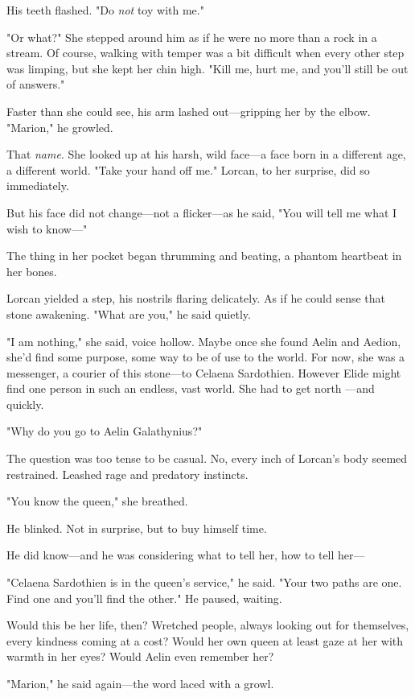 His teeth flashed.
"Do \emph{not} toy with me."

"Or what?"
She stepped around him as if he were no more than a rock in a stream.
Of course, walking with temper was a bit difficult when every other step was limping, but she kept her chin high.
"Kill me, hurt me, and you'll still be out of answers."

Faster than she could see, his arm lashed out---gripping her by the elbow.
"Marion," he growled.

That \emph{name}.
She looked up at his harsh, wild face---a face born in a different age, a different world.
"Take your hand off me."
Lorcan, to her surprise, did so immediately.

But his face did not change---not a flicker---as he said, "You will tell me what I wish to know---"

The thing in her pocket began thrumming and beating, a phantom heartbeat in her bones.

Lorcan yielded a step, his nostrils flaring delicately.
As if he could sense that stone awakening.
"What are you," he said quietly.

"I am nothing," she said, voice hollow.
Maybe once she found Aelin and Aedion, she'd find some purpose, some way to be of use to the world.
For now, she was a messenger, a courier of this stone---to Celaena Sardothien.
However Elide might find one person in such an endless, vast world.
She had to get north ---and quickly.

"Why do you go to Aelin Galathynius?"

The question was too tense to be casual.
No, every inch of Lorcan's body seemed restrained.
Leashed rage and predatory instincts.

"You know the queen," she breathed.

He blinked.
Not in surprise, but to buy himself time.

He did know---and he was considering what to tell her, how to tell her---

"Celaena Sardothien is in the queen's service," he said.
"Your two paths are one.
Find one and you'll find the other."
He paused, waiting.

Would this be her life, then?
Wretched people, always looking out for themselves, every kindness coming at a cost?
Would her own queen at least gaze at her with warmth in her eyes?
Would Aelin even remember her?

"Marion," he said again---the word laced with a growl.

